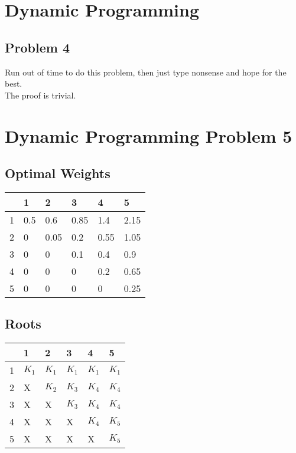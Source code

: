 \documentclass[12pt]{article}
\begin{document}
\section*{Dynamic Programming}

	\subsection*{Problem 4}
Run out of time to do this problem, then just type nonsense and hope for the best.\\
The proof is trivial.

\section*{Dynamic Programming Problem 5}
	\subsection*{Optimal Weights}
	\begin{tabular}{r || l | l | l | l  | l |}
		   &    1  &    2    &    3   &    4   &     5   \\ \hline \hline
		1 & 0.5  &	  0.6   & 0.85 & 1.4   &  2.15 \\ \hline
		2 &   0   &	  0.05 &  0.2  & 0.55 &  1.05 \\ \hline
		3 &   0   &    0    &  0.1  &  0.4  &  0.9   \\ \hline
		4 &   0   &    0    &   0    &  0.2  &  0.65 \\ \hline
		5 &   0   &	    0    &   0    &   0    &  0.25 \\ \hline
	\end{tabular}
	\subsection*{Roots}
	\begin{tabular}{r || l | l | l | l  | l |}
		   &          1  &       2    &           3   &         4   &     5   \\ \hline \hline
		1 & $K_{1}$ & $K_{1}$ &  $K_{1}$  & $K_{1}$ & $K_{1}$ \\ \hline
		2 &         X   & $K_{2}$ &  $K_{3}$  & $K_{4}$ & $K_{4}$\\ \hline
		3 &         X   &        X    &  $K_{3}$  & $K_{4}$ & $K_{4}$  \\ \hline
		4 &         X   &        X    &          X    & $K_{4}$ & $K_{5}$\\ \hline
		5 &         X   &        X    &          X    &     X       & $K_{5}$ \\ \hline
	\end{tabular}
\end{document}
